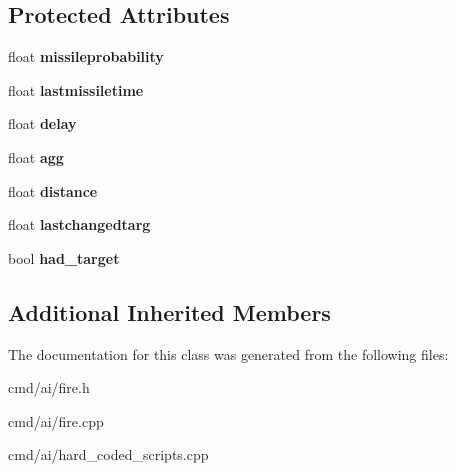 \subsection*{Protected Attributes}
\begin{DoxyCompactItemize}
\item 
float {\bfseries missileprobability}\hypertarget{classOrders_1_1FireAt_ac81ccacb0b8955ae629f760537504e11}{}\label{classOrders_1_1FireAt_ac81ccacb0b8955ae629f760537504e11}

\item 
float {\bfseries lastmissiletime}\hypertarget{classOrders_1_1FireAt_a2056dd15f93cc35d210ab78d4f7d79df}{}\label{classOrders_1_1FireAt_a2056dd15f93cc35d210ab78d4f7d79df}

\item 
float {\bfseries delay}\hypertarget{classOrders_1_1FireAt_a48b12f34c1271ec056679a58aa1c9671}{}\label{classOrders_1_1FireAt_a48b12f34c1271ec056679a58aa1c9671}

\item 
float {\bfseries agg}\hypertarget{classOrders_1_1FireAt_a1d459c91d9abe2c8833a998c03a7f4e8}{}\label{classOrders_1_1FireAt_a1d459c91d9abe2c8833a998c03a7f4e8}

\item 
float {\bfseries distance}\hypertarget{classOrders_1_1FireAt_a8f46ed2e9c3a3a6d597f0249e3acf928}{}\label{classOrders_1_1FireAt_a8f46ed2e9c3a3a6d597f0249e3acf928}

\item 
float {\bfseries lastchangedtarg}\hypertarget{classOrders_1_1FireAt_a21d9098aba0fe657ca458390c3294a3c}{}\label{classOrders_1_1FireAt_a21d9098aba0fe657ca458390c3294a3c}

\item 
bool {\bfseries had\+\_\+target}\hypertarget{classOrders_1_1FireAt_a6440ad256b86467d6a52e23a4b9cdbf1}{}\label{classOrders_1_1FireAt_a6440ad256b86467d6a52e23a4b9cdbf1}

\end{DoxyCompactItemize}
\subsection*{Additional Inherited Members}


The documentation for this class was generated from the following files\+:\begin{DoxyCompactItemize}
\item 
cmd/ai/fire.\+h\item 
cmd/ai/fire.\+cpp\item 
cmd/ai/hard\+\_\+coded\+\_\+scripts.\+cpp\end{DoxyCompactItemize}
